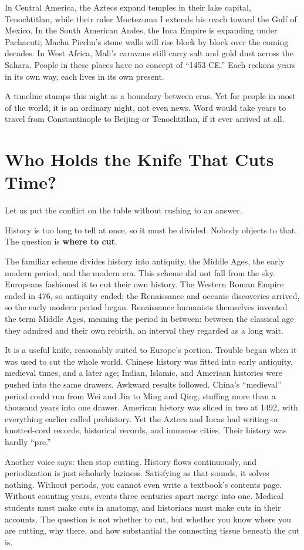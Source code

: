 In Central America, the Aztecs expand temples in their lake capital, Tenochtitlan, while their ruler Moctezuma I extends his reach toward the Gulf of Mexico. In the South American Andes, the Inca Empire is expanding under Pachacuti; Machu Picchu's stone walls will rise block by block over the coming decades. In West Africa, Mali's caravans still carry salt and gold dust across the Sahara. People in these places have no concept of ``1453 CE.'' Each reckons years in its own way, each lives in its own present.

A timeline stamps this night as a boundary between eras. Yet for people in most of the world, it is an ordinary night, not even news. Word would take years to travel from Constantinople to Beijing or Tenochtitlan, if it ever arrived at all.

\section{Who Holds the Knife That Cuts Time?}
Let us put the conflict on the table without rushing to an answer.

History is too long to tell at once, so it must be divided. Nobody objects to that. The question is \textbf{where to cut}.

The familiar scheme divides history into antiquity, the Middle Ages, the early modern period, and the modern era. This scheme did not fall from the sky. Europeans fashioned it to cut their own history. The Western Roman Empire ended in 476, so antiquity ended; the Renaissance and oceanic discoveries arrived, so the early modern period began. Renaissance humanists themselves invented the term Middle Ages, meaning the period in between: between the classical age they admired and their own rebirth, an interval they regarded as a long wait.

It is a useful knife, reasonably suited to Europe's portion. Trouble began when it was used to cut the whole world. Chinese history was fitted into early antiquity, medieval times, and a later age; Indian, Islamic, and American histories were pushed into the same drawers. Awkward results followed. China's ``medieval'' period could run from Wei and Jin to Ming and Qing, stuffing more than a thousand years into one drawer. American history was sliced in two at 1492, with everything earlier called prehistory. Yet the Aztecs and Incas had writing or knotted-cord records, historical records, and immense cities. Their history was hardly ``pre.''

Another voice says: then stop cutting. History flows continuously, and periodization is just scholarly laziness. Satisfying as that sounds, it solves nothing. Without periods, you cannot even write a textbook's contents page. Without counting years, events three centuries apart merge into one. Medical students must make cuts in anatomy, and historians must make cuts in their accounts. The question is not whether to cut, but whether you know where you are cutting, why there, and how substantial the connecting tissue beneath the cut is.

